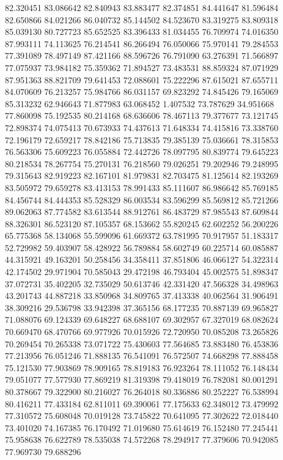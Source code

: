 82.320451
83.086642
82.840943
83.883477
82.374851
84.441647
81.596484
82.650866
84.021266
86.040732
85.144502
84.523670
83.319275
83.809318
85.039130
80.727723
85.652525
83.396433
81.034455
76.709974
74.016350
87.993111
74.113625
76.214541
86.266494
76.050066
75.970141
79.284553
77.391089
78.497149
87.421166
88.596726
76.791090
63.276391
71.566897
77.075937
73.984182
75.359362
71.894527
73.483531
88.859324
87.071929
87.951363
88.821709
79.641453
72.088601
75.222296
87.615021
87.655711
84.070609
76.213257
75.984766
86.031157
69.823292
74.845426
79.165069
85.313232
62.946643
71.877983
63.068452
1.407532
73.787629
34.951668
77.860098
75.192535
80.214168
68.636606
78.467113
79.377677
73.121745
72.898374
74.075413
70.673933
74.437613
71.648334
74.415816
73.338760
72.196179
72.659217
78.842186
75.713835
79.385139
75.036661
78.315853
76.563306
75.609223
76.055884
72.442726
78.097795
80.839774
79.645223
80.218534
78.267754
75.270131
76.218560
79.026251
79.202946
79.248995
79.315643
82.919223
82.167101
81.979831
82.703475
81.125614
82.193269
83.505972
79.659278
83.413153
78.991433
85.111607
86.986642
85.769185
84.456744
84.444353
85.528329
86.003534
83.596299
85.569812
85.721266
89.062063
87.774582
83.613544
88.912761
86.483729
87.985543
87.609844
88.326301
86.523120
87.105357
68.153662
55.820245
62.602252
56.200226
65.775368
58.134068
55.599096
61.669372
63.781995
70.917957
51.183317
52.729982
59.403907
58.428922
56.789884
58.602749
60.225714
60.085887
44.315921
49.163201
50.258456
34.358411
37.851806
46.066127
54.322314
42.174502
29.971904
70.585043
29.472198
46.793404
45.002575
51.898347
37.072731
35.402205
32.735029
50.613746
42.331420
47.566328
34.498963
43.201743
44.887218
33.850968
34.809765
37.413338
40.062564
31.906491
38.309216
29.536798
33.942398
37.365156
68.177235
70.887139
69.965827
71.088076
69.124339
69.648227
68.688107
69.302957
67.327019
68.082624
70.669470
68.470766
69.977926
70.015926
72.720950
70.085208
73.265826
70.269454
70.265338
73.071722
75.430603
77.564685
73.883480
76.453836
77.213956
76.051246
71.888135
76.541091
76.572507
74.668298
77.888458
75.121530
77.903869
78.909165
78.819183
76.923264
78.111052
76.148434
79.051077
77.577930
77.869219
81.319398
79.418019
76.782081
80.001291
80.378667
79.322900
80.216027
76.264018
80.336886
80.252227
76.538994
80.416211
77.433184
62.811011
69.390061
77.175633
62.348012
73.479992
77.310572
75.608048
70.019128
73.745822
70.641095
77.302622
72.018440
73.401020
74.167385
76.170492
71.019680
75.614619
76.152480
77.245441
75.958638
76.622789
78.535038
74.572268
78.294917
77.379606
70.942085
77.969730
79.688296
